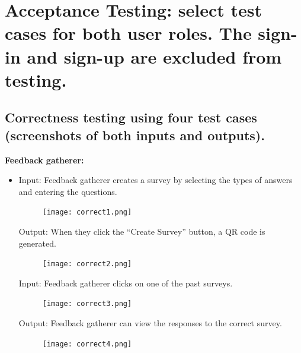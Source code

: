 \documentclass[letterpaper, 12 pt, conference]{ieeeconf}
\begin{document}
\section{Acceptance Testing: select test cases for both user roles. The sign-in and sign-up are excluded from testing.}
\subsection{Correctness testing using four test cases (screenshots of both inputs and outputs).}

\textbf{Feedback gatherer:}
\begin{itemize}
    \item[] Input: Feedback gatherer creates a survey by selecting the types of answers and entering the questions. 
    \begin{figure}[h]
        \centering
        \texttt{[image: correct1.png]}
\end{figure}

Output: When they click the “Create Survey” button, a QR code is generated.
\begin{figure}[h]
        \centering
        \texttt{[image: correct2.png]}
\end{figure}

Input: Feedback gatherer clicks on one of the past surveys.
\begin{figure}[h]
        \centering
        \texttt{[image: correct3.png]}
\end{figure}

Output: Feedback gatherer can view the responses to the correct survey.
\begin{figure}[h]
        \centering
        \texttt{[image: correct4.png]}
\end{figure}
\end{itemize}
\end{document}
